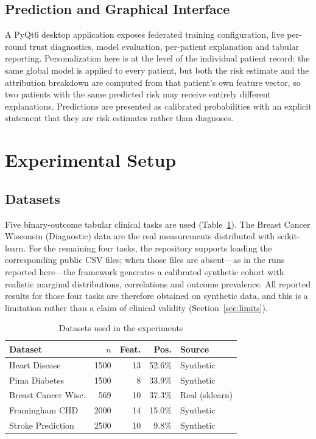 \documentclass[10pt,twocolumn,letterpaper]{article}
\begin{document}
\subsection{Prediction and Graphical Interface}
A PyQt6 desktop application exposes federated training configuration, live
per-round trust diagnostics, model evaluation, per-patient explanation and
tabular reporting. Personalization here is at the level of the individual
patient record: the same global model is applied to every patient, but both
the risk estimate and the attribution breakdown are computed from that
patient's own feature vector, so two patients with the same predicted risk
may receive entirely different explanations. Predictions are presented as calibrated probabilities with
an explicit statement that they are risk estimates rather than diagnoses.

\section{Experimental Setup}

\subsection{Datasets}
Five binary-outcome tabular clinical tasks are used
(Table~\ref{tab:datasets}). The Breast Cancer Wisconsin (Diagnostic) data are
the real measurements distributed with scikit-learn. For the remaining four tasks, the repository supports
loading the corresponding public CSV files; when those files are
absent---as in the runs reported here---the framework generates a
calibrated synthetic cohort with realistic marginal distributions,
correlations and outcome prevalence. All reported results for those four
tasks are therefore obtained on synthetic data, and this is a limitation
rather than a claim of clinical validity (Section~\ref{sec:limits}).

\begin{table}[t]
 \caption{Datasets used in the experiments}
 \label{tab:datasets}
 \centering
 \small
 \setlength{\tabcolsep}{3.5pt}
 \begin{tabular}{lrrrl}
 \toprule
 Dataset & $n$ & Feat. & Pos. & Source \\
 \midrule
 Heart Disease & 1500 & 13 & 52.6\% & Synthetic \\
 Pima Diabetes & 1500 & 8 & 33.9\% & Synthetic \\
 Breast Cancer Wisc. & 569 & 10 & 37.3\% & Real (sklearn) \\
 Framingham CHD & 2000 & 14 & 15.0\% & Synthetic \\
 Stroke Prediction & 2500 & 10 & 9.8\% & Synthetic \\
 \bottomrule
 \end{tabular}
\end{table}
\end{document}
